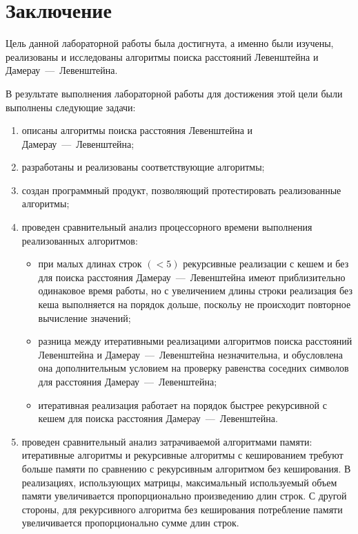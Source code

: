 \chapter*{Заключение}

Цель данной лабораторной работы была достигнута, а именно были изучены, реализованы и исследованы алгоритмы поиска расстояний Левенштейна и Дамерау~---~Левенштейна.

В результате выполнения лабораторной работы для достижения этой цели были выполнены следующие задачи:
\begin{enumerate}
    \item описаны алгоритмы поиска расстояния Левенштейна и Дамерау~---~Левенштейна;
    \item разработаны и реализованы соответствующие алгоритмы;
    \item создан программный продукт, позволяющий протестировать реализованные алгоритмы;
    \item проведен сравнительный анализ процессорного времени выполнения реализованных алгоритмов:
    \begin{itemize}
        \item при малых длинах строк $(< 5)$ рекурсивные реализации с кешем и без для поиска расстояния Дамерау~---~Левенштейна имеют приблизительно одинаковое время работы, 
	    но с увеличением длины строки реализация без кеша выполняется на порядок дольше, поскольу не происходит повторное вычисление значений;
        \item разница между итеративными реализацими алгоритмов поиска расстояний Левенштейна и Дамерау~---~Левенштейна незначительна, и обусловлена она
        дополнительным условием на проверку равенства соседних символов для расстояния Дамерау~---~Левенштейна;
        \item итеративная реализация работает на порядок быстрее рекурсивной с кешем для поиска расстояния Дамерау~---~Левенштейна.
        \end{itemize}
    \item проведен сравнительный анализ затрачиваемой алгоритмами памяти: итеративные алгоритмы и рекурсивные алгоритмы с кешированием требуют больше памяти по сравнению с рекурсивным алгоритмом без кеширования. 
    В реализациях, использующих матрицы, максимальный используемый объем памяти увеличивается пропорционально произведению длин строк. С другой стороны, для рекурсивного алгоритма без кеширования потребление памяти 
    увеличивается пропорционально сумме длин строк.
\end{enumerate}